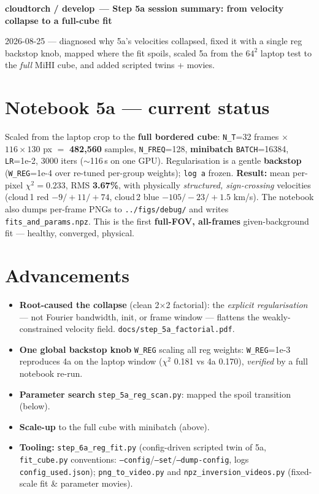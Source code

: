 \documentclass[10pt,a4paper]{article}
\newcommand{\co}[1]{{\small\texttt{#1}}}
\begin{document}
\small

{\sffamily\bfseries\large\color{acc} cloudtorch / develop\, --- Step 5a session summary: from velocity collapse to a full-cube fit}

\vspace{1pt}
{\sffamily\color{gry}\footnotesize 2026-08-25 --- diagnosed why 5a's velocities collapsed, fixed it with a single reg backstop knob, mapped where the fit spoils, scaled 5a from the $64^2$ laptop test to the \emph{full} MiHI cube, and added scripted twins + movies.}

\vspace{1pt}{\footnotesize\color{gry}\rule{\textwidth}{0.4pt}}

\section{Notebook 5a --- current status}
Scaled from the laptop crop to the \textbf{full bordered cube}: \co{N\_T}=32 frames $\times$ $116\times130$ px $=$ \textbf{482{,}560} samples, \co{N\_FREQ}=128, \textbf{minibatch} \co{BATCH}=16384, \co{LR}=1e-2, 3000 iters ($\sim$116\,s on one GPU). Regularisation is a gentle \textbf{backstop} (\co{W\_REG}=1e-4 over re-tuned per-group weights); \co{log a} frozen. \textbf{Result:} mean per-pixel $\chi^2=\mathbf{0.233}$, RMS \textbf{3.67\%}, with physically \emph{structured, sign-crossing} velocities (cloud\,1 red $-9/{+}11/{+}74$, cloud\,2 blue $-105/{-}23/{+}1.5$ km/s). The notebook also dumps per-frame PNGs to \co{../figs/debug/} and writes \co{fits\_and\_params.npz}. This is the first \textbf{full-FOV, all-frames} given-background fit --- healthy, converged, physical.

\section{Advancements}
\begin{itemize}
\item \textbf{Root-caused the collapse} (clean 2$\times$2 factorial): the \emph{explicit regularisation} --- not Fourier bandwidth, init, or frame window --- flattens the weakly-constrained velocity field. \co{docs/step\_5a\_factorial.pdf}.
\item \textbf{One global backstop knob} \co{W\_REG} scaling all reg weights: \co{W\_REG}=1e-3 reproduces 4a on the laptop window ($\chi^2$ 0.181 vs 4a 0.170), \emph{verified} by a full notebook re-run.
\item \textbf{Parameter search} \co{step\_5a\_reg\_scan.py}: mapped the spoil transition (below).
\item \textbf{Scale-up} to the full cube with minibatch (above).
\item \textbf{Tooling:} \co{step\_6a\_reg\_fit.py} (config-driven scripted twin of 5a, \co{fit\_cube.py} conventions: \co{--config}/\co{--set}/\co{--dump-config}, logs \co{config\_used.json}); \co{png\_to\_video.py} and \co{npz\_inversion\_videos.py} (fixed-scale fit \& parameter movies).
\end{itemize}
\end{document}
